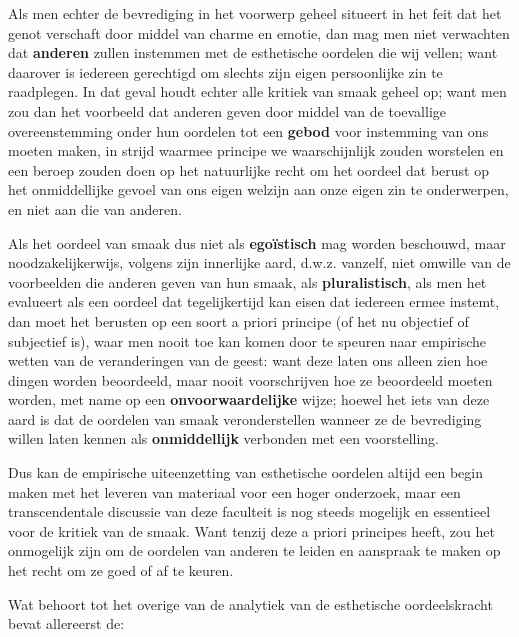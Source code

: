 Als men echter de bevrediging in het voorwerp geheel situeert in het feit dat het genot verschaft door middel van charme en emotie, dan mag men niet verwachten dat \textbf{anderen} zullen instemmen met de esthetische oordelen die wij vellen; want daarover is iedereen gerechtigd om slechts zijn eigen persoonlijke zin te raadplegen. In dat geval houdt echter alle kritiek van smaak geheel op; want men zou dan het voorbeeld dat anderen geven door middel van de toevallige overeenstemming onder hun oordelen tot een \textbf{gebod} voor instemming van ons moeten maken, in strijd waarmee principe we waarschijnlijk zouden worstelen en een beroep zouden doen op het natuurlijke recht om het oordeel dat berust op het onmiddellijke gevoel van ons eigen welzijn aan onze eigen zin te onderwerpen, en niet aan die van anderen.

Als het oordeel van smaak dus niet als \textbf{egoïstisch} mag worden beschouwd, maar noodzakelijkerwijs, volgens zijn innerlijke aard, d.w.z. vanzelf, niet omwille van de voorbeelden die anderen geven van hun smaak, als \textbf{pluralistisch}, als men het evalueert als een oordeel dat tegelijkertijd kan eisen dat iedereen ermee instemt, dan moet het berusten op een soort a priori principe (of het nu objectief of subjectief is), waar men nooit toe kan komen door te speuren naar empirische wetten van de veranderingen van de geest: want deze laten ons alleen zien hoe dingen worden beoordeeld, maar nooit voorschrijven hoe ze beoordeeld moeten worden, met name op een \textbf{onvoorwaardelijke} wijze; hoewel het iets van deze aard is dat de oordelen van smaak veronderstellen wanneer ze de bevrediging willen laten kennen als \textbf{onmiddellijk} verbonden met een voorstelling.

Dus kan de empirische uiteenzetting van esthetische oordelen altijd een begin maken met het leveren van materiaal voor een hoger onderzoek, maar een transcendentale discussie van deze faculteit is nog steeds mogelijk en essentieel voor de kritiek van de smaak. Want tenzij deze a priori principes heeft, zou het onmogelijk zijn om de oordelen van anderen te leiden en aanspraak te maken op het recht om ze goed of af te keuren.

Wat behoort tot het overige van de analytiek van de esthetische oordeelskracht bevat allereerst de:

